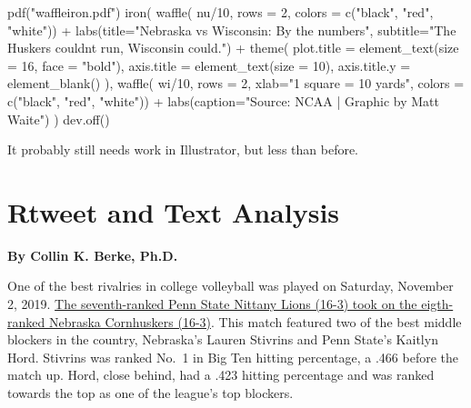 \documentclass[
]{book}
\newenvironment{Shaded}{\begin{snugshade}}{\end{snugshade}}
\newcommand{\AttributeTok}[1]{\textcolor[rgb]{0.77,0.63,0.00}{#1}}
\newcommand{\DecValTok}[1]{\textcolor[rgb]{0.00,0.00,0.81}{#1}}
\newcommand{\FunctionTok}[1]{\textcolor[rgb]{0.00,0.00,0.00}{#1}}
\newcommand{\NormalTok}[1]{#1}
\newcommand{\SpecialCharTok}[1]{\textcolor[rgb]{0.00,0.00,0.00}{#1}}
\newcommand{\StringTok}[1]{\textcolor[rgb]{0.31,0.60,0.02}{#1}}
\begin{document}
\begin{Shaded}
\begin{Highlighting}[]
\FunctionTok{pdf}\NormalTok{(}\StringTok{"waffleiron.pdf"}\NormalTok{)}
\FunctionTok{iron}\NormalTok{(}
 \FunctionTok{waffle}\NormalTok{(}
\NormalTok{   nu}\SpecialCharTok{/}\DecValTok{10}\NormalTok{, }
   \AttributeTok{rows =} \DecValTok{2}\NormalTok{, }
   \AttributeTok{colors =} \FunctionTok{c}\NormalTok{(}\StringTok{"black"}\NormalTok{, }\StringTok{"red"}\NormalTok{, }\StringTok{"white"}\NormalTok{)) }\SpecialCharTok{+} 
   \FunctionTok{labs}\NormalTok{(}\AttributeTok{title=}\StringTok{"Nebraska vs Wisconsin: By the numbers"}\NormalTok{, }\AttributeTok{subtitle=}\StringTok{"The Huskers couldn\textquotesingle{}t run, Wisconsin could."}\NormalTok{) }\SpecialCharTok{+} 
   \FunctionTok{theme}\NormalTok{(}
    \AttributeTok{plot.title =} \FunctionTok{element\_text}\NormalTok{(}\AttributeTok{size =} \DecValTok{16}\NormalTok{, }\AttributeTok{face =} \StringTok{"bold"}\NormalTok{),}
    \AttributeTok{axis.title =} \FunctionTok{element\_text}\NormalTok{(}\AttributeTok{size =} \DecValTok{10}\NormalTok{),}
    \AttributeTok{axis.title.y =} \FunctionTok{element\_blank}\NormalTok{()}
\NormalTok{  ),}
 \FunctionTok{waffle}\NormalTok{(}
\NormalTok{   wi}\SpecialCharTok{/}\DecValTok{10}\NormalTok{, }
   \AttributeTok{rows =} \DecValTok{2}\NormalTok{, }
   \AttributeTok{xlab=}\StringTok{"1 square = 10 yards"}\NormalTok{, }
   \AttributeTok{colors =} \FunctionTok{c}\NormalTok{(}\StringTok{"black"}\NormalTok{, }\StringTok{"red"}\NormalTok{, }\StringTok{"white"}\NormalTok{)) }\SpecialCharTok{+} \FunctionTok{labs}\NormalTok{(}\AttributeTok{caption=}\StringTok{"Source: NCAA | Graphic by Matt Waite"}\NormalTok{)}
\NormalTok{) }
\FunctionTok{dev.off}\NormalTok{()}
\end{Highlighting}
\end{Shaded}

It probably still needs work in Illustrator, but less than before.

\hypertarget{rtweet-and-text-analysis}{%
\chapter{Rtweet and Text Analysis}\label{rtweet-and-text-analysis}}

\textbf{By Collin K. Berke, Ph.D.}

One of the best rivalries in college volleyball was played on Saturday, November 2, 2019. \href{https://journalstar.com/sports/huskers/volleyball/john-cook-on-the-radio-nebraska-penn-state-match-will/article_c1d5c426-e136-5ef2-b589-510a0f17da82.html}{The seventh-ranked Penn State Nittany Lions (16-3) took on the eigth-ranked Nebraska Cornhuskers (16-3)}. This match featured two of the best middle blockers in the country, Nebraska's Lauren Stivrins and Penn State's Kaitlyn Hord. Stivrins was ranked No.~1 in Big Ten hitting percentage, a .466 before the match up. Hord, close behind, had a .423 hitting percentage and was ranked towards the top as one of the league's top blockers.
\end{document}
